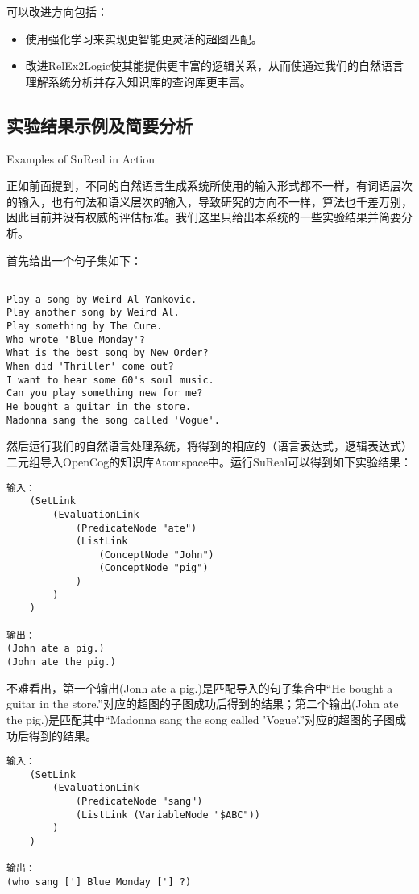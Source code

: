 可以改进方向包括：

\begin{itemize}
\item 使用强化学习来实现更智能更灵活的超图匹配。
\item 改进RelEx2Logic使其能提供更丰富的逻辑关系，从而使通过我们的自然语言理解系统分析并存入知识库的查询库更丰富。
\end{itemize}


\subsection{实验结果示例及简要分析}{Examples of SuReal in Action}


正如前面提到，不同的自然语言生成系统所使用的输入形式都不一样，有词语层次的输入，也有句法和语义层次的输入，导致研究的方向不一样，算法也千差万别，因此目前并没有权威的评估标准。我们这里只给出本系统的一些实验结果并简要分析。

首先给出一个句子集如下：

\begin{verbatim}

Play a song by Weird Al Yankovic.
Play another song by Weird Al.
Play something by The Cure.
Who wrote 'Blue Monday'?
What is the best song by New Order?
When did 'Thriller' come out?
I want to hear some 60's soul music.
Can you play something new for me?
He bought a guitar in the store.
Madonna sang the song called 'Vogue'.

\end{verbatim}

然后运行我们的自然语言处理系统，将得到的相应的（语言表达式，逻辑表达式）二元组导入OpenCog的知识库Atomspace中。运行SuReal可以得到如下实验结果：

\begin{verbatim}
输入：
    (SetLink
        (EvaluationLink
            (PredicateNode "ate")
            (ListLink
                (ConceptNode "John")
                (ConceptNode "pig")
            )
        )
    )

输出：
(John ate a pig.)
(John ate the pig.)

\end{verbatim}

不难看出，第一个输出(Jonh ate a pig.)是匹配导入的句子集合中“He bought a guitar in the store.”对应的超图的子图成功后得到的结果；第二个输出(John ate the pig.)是匹配其中“Madonna sang the song called 'Vogue'.”对应的超图的子图成功后得到的结果。

\begin{verbatim}
输入：
    (SetLink
        (EvaluationLink
            (PredicateNode "sang")
            (ListLink (VariableNode "$ABC"))
        )
    )

输出：
(who sang ['] Blue Monday ['] ?)

\end{verbatim}

